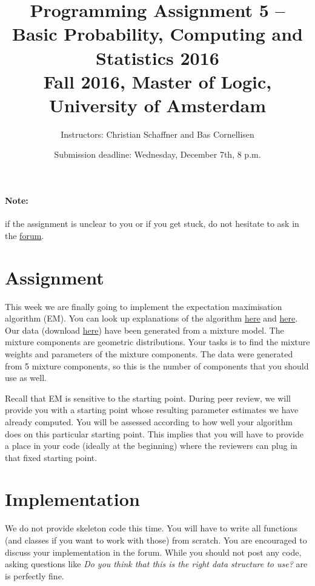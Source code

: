 \documentclass[11pt, leqno, a4paper]{article}
\title{Programming Assignment 5 -- Basic Probability, Computing and Statistics 2016 \\[2mm]
\large{Fall 2016, Master of Logic, University of Amsterdam}}
\author{Instructors: Christian Schaffner and Bas Cornellisen}
\date{Submission deadline: Wednesday, December 7th, 8 p.m.}
\begin{document}
\maketitle

\paragraph{Note:} if the assignment is unclear to you or if you get
stuck, do not hesitate to ask in the
\href{https://www.moodle.ch/lms/mod/forum/view.php?id=1721}{forum}.

\section{Assignment}

This week we are finally going to implement the expectation maximisation algorithm (EM). You can look up explanations of the algorithm 
\href{https://github.com/BasicProbability/LectureNotes/blob/master/chapter6/chapter6.pdf}{here} and 
\href{}{here}. Our data (download \href{https://github.com/BasicProbability/BasicProbability.github.io/raw/master/Homework/Programming/2016-17/Assignment5/geometric_data.txt}{here}) have been generated from a mixture model. The mixture components are geometric distributions. Your tasks is to find
the mixture weights and parameters of the mixture components. The data were generated from 5 mixture components, so this is the number of components
that you should use as well.

Recall that EM is sensitive to the starting point. During peer review, we will
provide you with a starting point whose resulting parameter estimates we have already computed. You will be assessed according to how well your
algorithm does on this particular starting point. This implies that you will have to provide a place in your code (ideally at the beginning) where
the reviewers can plug in that fixed starting point.

\section{Implementation}

We do not provide skeleton code this time. You will have to write all functions (and classes if you want to work with those) from scratch. You are encouraged
to discuss your implementation in the forum. While you should not post any code, asking questions like \textit{Do you think that this is the right data structure
to use?} are is perfectly fine. 
\end{document}
